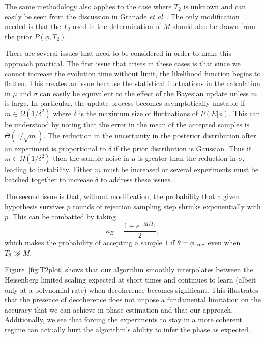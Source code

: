 \documentclass[aps,pra,amsmath,twocolumn,amssymb,superscriptaddress]{revtex4-1}
\newcommand{\fig}[1]{\hyperref[fig:#1]{Figure~\ref*{fig:#1}}}
\newcommand{\etal}{\emph{et al}}
\begin{document}

The same methodology also applies to the case where
$T_2$ is unknown and can easily be seen from the discussion
in Granade \etal~\cite{granade_robust_2012}.  The only modification needed is that the $T_2$
used in the determination of $M$ should also be drawn from the prior
$P(\phi,T_2)$.




There are several issues that need to be considered in order to make this approach practical.  The first issue that arises in these cases is that since we cannot increase the evolution time without limit, the likelihood function begins to flatten.  This creates an issue because the statistical fluctuations in the calculation in $\mu$ and $\sigma$ can easily be equivalent to the effect of the Bayesian update unless $m$ is large.  In particular, the update process becomes asymptotically unstable if $m \in \Omega(1/\delta^2)$ where $\delta$ is the maximum size of fluctuations of $P(E|\phi)$.  This can be understood by noting that the error in the mean of the accepted samples is $\Theta(1/\sqrt{m})$.  The reduction in the uncertainty in the posterior distribution after an experiment is proportional to $\delta$ if the prior distribution is Gaussian.  Thus if $m\in \Omega(1/\delta^2)$ then the sample noise in $\mu$ is greater than the reduction in $\sigma$, leading to instability.  Either $m$ must be increased or several experiments must be batched together to increase $\delta$  to address these issues. 

The second issue is that, without modification, the probability that a given hypothesis survives $p$ rounds of rejection sampling step shrinks exponentially with $p$.  This can be combatted by taking
\begin{equation}
\kappa_E = \frac{1+e^{-M/T_2}}{2},
\end{equation}
which makes the probability of accepting a sample $1$ if $\theta = \phi_{\rm true}$ even when $T_2\not\gg M$. 

\fig{T2plot} shows that our algorithm smoothly interpolates between the Heisenberg limited scaling expected at short times and continues to learn (albeit only at a polynomial rate) when decoherence becomes significant.  This illustrates that the presence of decoherence does not impose a fundamental limitation on the accuracy that we can achieve in phase estimation and that our approach.  Additionally, we see that forcing the experiments to stay in a more coherent regime can actually hurt the algorithm's ability to infer the phase as expected.
\end{document}
